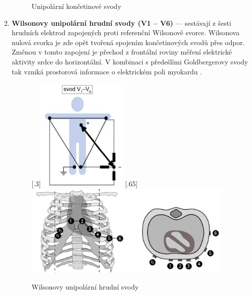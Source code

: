 \begin{enumerate}
\begin{figure}[h]
\begin{center}
			      \caption{Unipolární končetinové svody \cite{Kittnar2020}}
			      \label{fig:unipolar1}
		      \end{center}
	      \end{figure}
	\item \textbf{Wilsonovy unipolární hrudní svody (V1 -- V6)} --- sestávají z
	      šesti hrudních elektrod zapojených proti referenční Wilsonově svorce.
	      Wilsonova nulová svorka je zde opět tvořená spojením končetinových
	      svodů přes odpor. Změnou v tomto zapojení je přechod z frontální
	      roviny měření elektrické aktivity srdce do horizontální. V kombinaci s
	      předešlími Goldbergerovy svody tak vzniká prostorová informace o
	      elektrickém poli myokardu \cite{Kittnar2020}.
	      \begin{figure}[h]
		      \centering
		      [.3\linewidth]{\includegraphics[height=5.5cm]{../assets/anatomy/unipolar2}}
		      \hfill
		      [.65\linewidth]{\includegraphics[height=4.5cm]{../assets/anatomy/unipolar3}}
		      \caption{Wilsonovy unipolární hrudní svody}
		      \label{fig:wilson}
	      \end{figure}
\end{enumerate}

